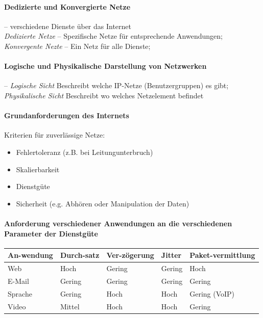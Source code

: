 \documentclass[a4paper,12pt]{article}
\begin{document}
\paragraph{Dedizierte und Konvergierte Netze} -- verschiedene Dienste über das Internet\\
\emph{Dedizierte Netze} -- Spezifische Netze für entsprechende Anwendungen; \emph{Konvergente Nezte} -- Ein Netz für alle Dienste;

\paragraph{Logische und Physikalische Darstellung von Netzwerken} -- \emph{Logische Sicht} Beschreibt welche IP-Netze (Benutzergruppen) es gibt; \emph{Physikalische Sicht} Beschreibt wo welches Netzelement befindet

\paragraph{Grundanforderungen des Internets}
Kriterien für zuverlässige Netze:

\begin{itemize}
\item Fehlertoleranz (z.B. bei Leitungunterbruch)
\item Skalierbarkeit
\item Dienstgüte
\item Sicherheit (e.g. Abhören oder Manipulation der Daten)
\end{itemize}

\paragraph{Anforderung verschiedener Anwendungen an die verschiedenen Parameter der Dienstgüte}

\begin{center}
\begin{tabular}{ | m{1.2cm} |m{1.2cm}|m{2cm}|m{1cm}|m{2cm}| } 
An-wendung & Durch-satz & Ver-zögerung & Jitter & Paket-vermittlung\\ 
\hline
Web & Hoch & Gering & Gering & Hoch\\
E-Mail & Gering & Gering & Gering & Gering\\
Sprache & Gering & Hoch & Hoch & Gering (VoIP)\\
Video & Mittel & Hoch & Hoch & Gering\\
\end{tabular}
\end{center}
\end{document}
